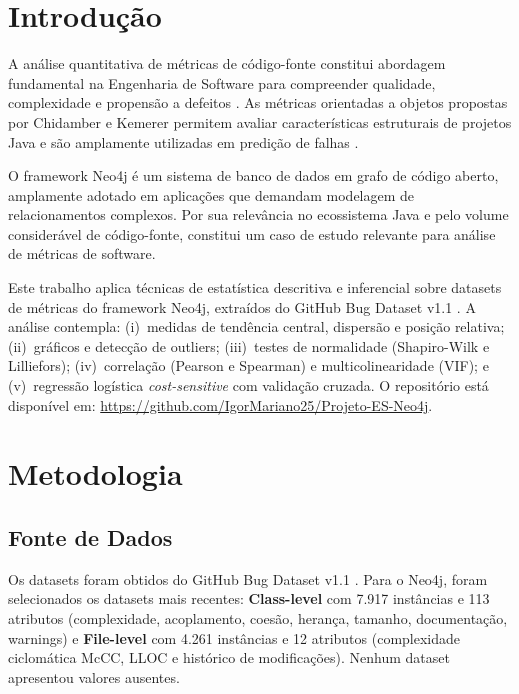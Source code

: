 \documentclass[12pt]{article}
\begin{document}
\section{Introdução} \label{sec:intro}

A análise quantitativa de métricas de código-fonte constitui abordagem fundamental na Engenharia de Software para compreender qualidade, complexidade e propensão a defeitos \cite{pressman2014}. As métricas orientadas a objetos propostas por Chidamber e Kemerer \cite{chidamber1994} permitem avaliar características estruturais de projetos Java e são amplamente utilizadas em predição de falhas \cite{gyimothy2005, basili1996}.

O framework Neo4j é um sistema de banco de dados em grafo de código aberto, amplamente adotado em aplicações que demandam modelagem de relacionamentos complexos. Por sua relevância no ecossistema Java e pelo volume considerável de código-fonte, constitui um caso de estudo relevante para análise de métricas de software.

Este trabalho aplica técnicas de estatística descritiva e inferencial sobre datasets de métricas do framework Neo4j, extraídos do GitHub Bug Dataset v1.1 \cite{toth2016}. A análise contempla: (i)~medidas de tendência central, dispersão e posição relativa; (ii)~gráficos e detecção de outliers; (iii)~testes de normalidade (Shapiro-Wilk e Lilliefors); (iv)~correlação (Pearson e Spearman) e multicolinearidade (VIF); e (v)~regressão logística \textit{cost-sensitive} com validação cruzada. O repositório está disponível em: \url{https://github.com/IgorMariano25/Projeto-ES-Neo4j}.

\section{Metodologia} \label{sec:metodo}

\subsection{Fonte de Dados}

Os datasets foram obtidos do GitHub Bug Dataset v1.1 \cite{toth2016}. Para o Neo4j, foram selecionados os datasets mais recentes: \textbf{Class-level} com 7.917 instâncias e 113 atributos (complexidade, acoplamento, coesão, herança, tamanho, documentação, warnings) e \textbf{File-level} com 4.261 instâncias e 12 atributos (complexidade ciclomática McCC, LLOC e histórico de modificações). Nenhum dataset apresentou valores ausentes.
\end{document}
